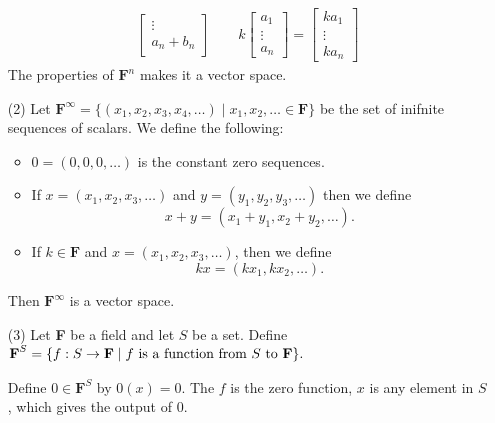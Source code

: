 \documentclass[11pt]{article}
\begin{document}
\begin{enumerate}
\begin{align*}
\begin{bmatrix}
                                                \vdots    \\
                                                a_n + b_n 
                                            \end{bmatrix} \qquad
            k \begin{bmatrix}
                a_1    \\
                \vdots \\
                a_n
              \end{bmatrix} = \begin{bmatrix}
                  k a_1  \\
                  \vdots \\
                  k a_n
              \end{bmatrix}
        \end{align*}
        The properties of \(\textbf{F}^n\) makes it a vector space. 

        \item[(2)] Let \(\textbf{F}^{\infty} = \{(x_1,x_2,x_3,x_4, \dots) \mid x_1,x_2,\dots \in \textbf{F}\}\) be the set of inifnite sequences of scalars. We define the following:
        \begin{itemize}
            \item \(0 = (0,0,0,\dots)\) is the constant zero sequences.
            \item If \(x = (x_1, x_2, x_3, \dots)\) and \(y = (y_1,y_2,y_3, \dots)\) then we define \[x + y = (x_1 + y_1, x_2 + y_2, \dots).\]
            \item If \(k \in \textbf{F}\) and \(x = (x_1,x_2,x_3, \dots)\), then we define \[kx = (kx_1, kx_2, \dots).\]
        \end{itemize}
        Then \(\textbf{F}^{\infty}\) is a vector space.  

        \pagebreak

        \item[(3)] Let \textbf{F} be a field and let $S$ be a set. Define \(\textbf{F}^{S} = \{f : S \rightarrow \textbf{F} \mid \text{$f$ is a function from $S$ to \textbf{F}}\}.\)
        
        \vspace{1em}

        Define \(0 \in \textbf{F}^{S}\) by \(0(x) = 0\). The $f$ is the zero function, $x$ is any element in $S$, which gives the output of 0. 

        \vspace{1em}


\end{enumerate}
\end{document}
